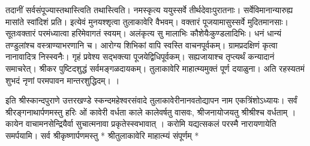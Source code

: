तदानीं सर्वसंपूज्यास्तथास्त्विति तथास्त्विति।
नमस्कृत्य ययुस्सर्वे तीर्थदेवाःपुरातनाः।
सर्वेविमानान्यारुह्य मासांते स्वांदिशं प्रति।
इत्येवं मुनयश्शृत्वा तुलाकावेरि वैभवम्।
वक्तारं पूजयामासुस्सर्वे मुदितमानसाः।
सूतःवक्तारं परमंध्यात्वा हरिमेवागतं स्वयम्।
अलंकृत्य सु मालाभिः कौशेयैःकुण्डलादिभिः।
धनं धान्यं तण्डुलांश्च वस्त्राण्याभरणानि च।
आरोग्य शिभिकां वापि स्वस्ति वाचनपूर्वकम्।
ग्रामप्रदक्षिणं कृत्वा नानावादित्र निस्स्वनैः।
गृहं प्रवेश्य सद्भक्त्या पूजयेद्विधिपूर्वकम्।
सह्यजायाश्च तृप्त्यर्थं कन्यादानं समाचरेत्।
श्रीकर पुष्टिदशुद्धं सर्वमङ्गळदायकम्।
तुलाकावेरि माहात्म्यमुक्तं पूर्ण दयाळुना।
अति रहस्यतमं शुभदं नृणां
परमपावन मान्तरशुद्धिदम्।
।

इति श्रीस्कान्दपुराणे उत्तरखण्डे स्कन्दमहेश्वरसंवादे तुलाकावेरीनानवतोद्यापन नाम
एकत्रिंशोऽध्यायः। सर्वं श्रीरङ्गनाथार्पणमस्तु
हरिः ओं कावेरी वर्धता काले कालेवर्षतु वासवः, श्रीजनायोजयतु श्रीश्रीश्च वर्धताम् ।
कायेन वाचामनसेन्द्रियैर्वा सुचात्मनावा प्रकृतेस्स्वभावात् । करोमि यद्यत्सकलं परस्मै नारायणायेति समर्पयामि।
सर्व श्रीकृष्णार्पणमस्तु
*
श्रीतुलाकावेरि माहात्म्यं संपूर्णम् *
